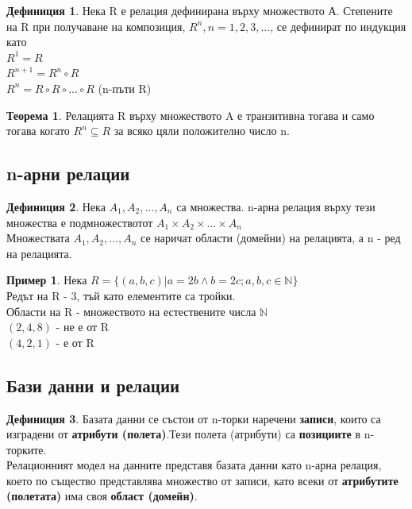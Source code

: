 \documentclass[fleqn, 12pt]{article}
\theoremstyle{definition}
\newtheorem{example}{Пример}[subsection]
\newtheorem{definition}{Дефиниция}[subsection]
\newtheorem{theorem}{Теорема}[subsection]
\begin{document}
\begin{definition}
Нека R е релация дефинирана върху множеството А. Степените на R при получаване на композиция, $R^n, n = 1, 2, 3, ...$, се дефинират по индукция като \\
$R^1 = R$ \\
$R^{n+1} = R^n \circ R$ \\
$R^n = R \circ R \circ ... \circ R$ (n-пъти R)
\end{definition}

\begin{theorem}
Релацията R върху множеството A е транзитивна тогава и само тогава когато $R^n \subseteq R$ за всяко цяли положително число n.
\end{theorem}

\subsection{n-арни релации}

\begin{definition}
Нека $A_1, A_2, ..., A_n$ са множества. n-арна релация върху тези множества е подмножествотот $A_1 \times A_2 \times ... \times A_n$ \\
Множествата $A_1, A_2, ..., A_n$ се наричат области (домейни) на релацията, а n - ред на релацията. 
\end{definition}

\begin{example}
Нека  $R = \{ (a, b, c) | a = 2b \land b = 2c; a,b,c \in \mathbb{N} \}$\\
Редът на R - 3, тъй като елементите са тройки. \\
Области на R - множеството на естествените числа $\mathbb{N}$ \\
$(2, 4, 8)$ - не е от R \\
$(4, 2, 1)$ - е от R
\end{example}

\subsection{Бази данни и релации}

\begin{definition}
Базата данни се състои от n-торки  наречени \textbf{записи}, които са изградени от \textbf{атрибути (полета)}.Тези полета (атрибути) са \textbf{позициите} в n-торките.\\
Релационният модел на данните представя базата данни като n-арна релация, което по същество представлява множество от записи, като всеки от \textbf{атрибутите (полетата)} има своя \textbf{област (домейн)}.
\end{definition}
\end{document}
